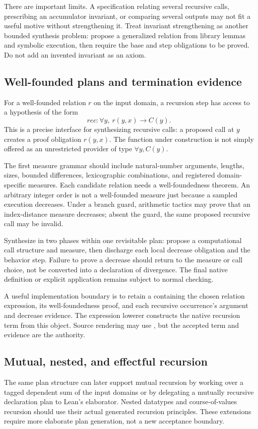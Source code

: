 There are important limits. A specification relating several recursive calls, prescribing an accumulator invariant, or comparing several outputs may not fit a useful motive without strengthening it. Treat invariant strengthening as another bounded synthesis problem: propose a generalized relation from library lemmas and symbolic execution, then require the base and step obligations to be proved. Do not add an invented invariant as an axiom.

\subsection{Well-founded plans and termination evidence}
For a well-founded relation $r$ on the input domain, a recursion step has access to a hypothesis of the form
\[
 \mathit{rec}:\forall y,\ r(y,x)\to C(y).
\]
This is a precise interface for synthesizing recursive calls: a proposed call at $y$ creates a proof obligation $r(y,x)$. The function under construction is not simply offered as an unrestricted provider of type $\forall y,C(y)$.

The first measure grammar should include natural-number arguments, lengths, sizes, bounded differences, lexicographic combinations, and registered domain-specific measures. Each candidate relation needs a well-foundedness theorem. An arbitrary integer order is not a well-founded measure just because a sampled execution decreases. Under a branch guard, arithmetic tactics may prove that an index-distance measure decreases; absent the guard, the same proposed recursive call may be invalid.

Synthesize in two phases within one revisitable plan: propose a computational call structure and measure, then discharge each local decrease obligation and the behavior step. Failure to prove a decrease should return to the measure or call choice, not be converted into a declaration of divergence. The final native definition or explicit  application remains subject to normal checking.

A useful implementation boundary is to retain a  containing the chosen relation expression, its well-foundedness proof, and each recursive occurrence's argument and decrease evidence. The expression lowerer constructs the native recursion term from this object. Source rendering may use , but the accepted term and evidence are the authority.

\subsection{Mutual, nested, and effectful recursion}
The same plan structure can later support mutual recursion by working over a tagged dependent sum of the input domains or by delegating a mutually recursive declaration plan to Lean's elaborator. Nested datatypes and course-of-values recursion should use their actual generated recursion principles. These extensions require more elaborate plan generation, not a new acceptance boundary.

